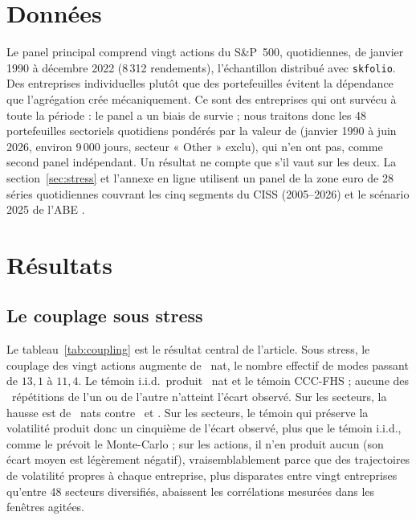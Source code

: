 \documentclass[12pt]{article}
\theoremstyle{definition}
\begin{document}
\begin{doublespace}
\section{Données}
\label{sec:data}

Le panel principal comprend vingt actions du S\&P~500, quotidiennes, de
janvier 1990 à décembre 2022 (8\,312 rendements), l'échantillon distribué avec
\texttt{skfolio}. Des entreprises individuelles plutôt que des portefeuilles
évitent la dépendance que l'agrégation crée mécaniquement. Ce sont des
entreprises qui ont survécu à toute la période : le panel a un biais de
survie ; nous traitons donc les 48 portefeuilles sectoriels quotidiens
pondérés par la valeur de \citet{french2026} (janvier 1990 à juin 2026,
environ 9\,000 jours, secteur « Other » exclu), qui n'en ont pas, comme second
panel indépendant. Un résultat ne compte que s'il vaut sur les deux. La
section~\ref{sec:stress} et l'annexe en ligne utilisent un panel de la zone
euro de 28 séries quotidiennes couvrant les cinq segments du CISS
(2005--2026) et le scénario 2025 de l'ABE \citep{eba2025}.

\section{Résultats}
\label{sec:results}

\subsection{Le couplage sous stress}

Le tableau~\ref{tab:coupling} est le résultat central de l'article. Sous
stress, le couplage des vingt actions augmente de \qCplSpObs~nat, le nombre
effectif de modes passant de $13{,}1$ à $11{,}4$. Le témoin i.i.d.\ produit
\qCplSpIid~nat et le témoin CCC-FHS \gnSpRawNull ; aucune des \nRep\ répétitions
de l'un ou de l'autre n'atteint l'écart observé. Sur les secteurs, la hausse
est de \qCplFfObs~nats contre \qCplFfIid\ et \gnFfRawNull. Sur les secteurs, le
témoin qui préserve la volatilité produit donc un cinquième de l'écart observé,
plus que le témoin i.i.d., comme le prévoit le Monte-Carlo ; sur les actions,
il n'en produit aucun (son écart moyen est légèrement négatif),
vraisemblablement parce que des trajectoires de volatilité propres à chaque
entreprise, plus disparates entre vingt entreprises qu'entre 48 secteurs
diversifiés, abaissent les corrélations mesurées dans les fenêtres agitées.


\end{doublespace}
\end{document}
